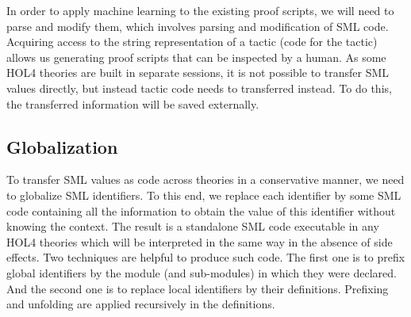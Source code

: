 \documentclass[runningheads,a4paper,draft]{svjour3}
\def\holfour{\textsf{HOL4}\xspace}
\def\sml{\textsf{SML}\xspace}
\begin{document}
In order to apply machine learning to the existing proof scripts, we will need 
to
parse and modify them, which involves parsing and modification of \sml code.
Acquiring access to the string representation of a tactic (code for the tactic) 
allows us generating
proof scripts that can be inspected by a human.
As some \holfour theories are built in separate sessions, it is not possible
to transfer \sml values directly, but instead tactic code needs to transferred 
instead.
To do this, the transferred information will be saved externally.

\subsection{Globalization}
To transfer \sml values as code across theories in a conservative manner, we 
need to 
globalize \sml identifiers. To this end, we replace each identifier by some 
\sml code containing all the information to obtain the value of this identifier 
without knowing the context. The result is a standalone \sml code executable in 
any \holfour theories which will be interpreted in the same way in the absence 
of side effects. Two techniques are helpful to produce such code. The first one 
is to prefix global identifiers by the module (and sub-modules) in which they 
were declared. And the second one is to replace local identifiers 
by their definitions. Prefixing and 
unfolding are applied recursively in 
the definitions.
\end{document}
